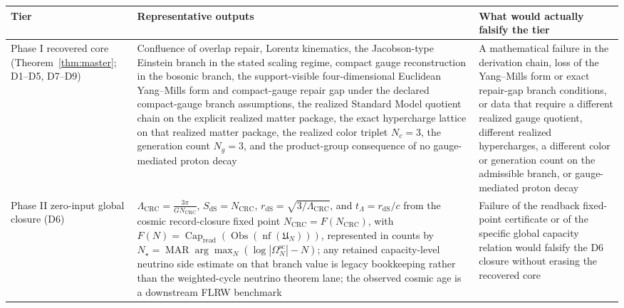\documentclass[11pt]{article}
\begin{document}
\begingroup
\footnotesize
\begin{longtable}{@{}>{\raggedright\arraybackslash}p{}>{\raggedright\arraybackslash}p{}>{\raggedright\arraybackslash}p{}@{}}
\toprule
Tier & Representative outputs & What would actually falsify the tier \\
\midrule
\endhead
\bottomrule
\endfoot
Phase I recovered core (Theorem~\ref{thm:master}; D1--D5, D7--D9) & Confluence of overlap repair, Lorentz kinematics, the Jacobson-type Einstein branch in the stated scaling regime, compact gauge reconstruction in the bosonic branch, the support-visible four-dimensional Euclidean Yang--Mills form and compact-gauge repair gap under the declared compact-gauge branch assumptions, the realized Standard Model quotient chain on the explicit realized matter package, the exact hypercharge lattice on that realized matter package, the realized color triplet \(N_c=3\), the generation count \(N_g=3\), and the product-group consequence of no gauge-mediated proton decay & A mathematical failure in the derivation chain, loss of the Yang--Mills form or exact repair-gap branch conditions, or data that require a different realized gauge quotient, different realized hypercharges, a different color or generation count on the admissible branch, or gauge-mediated proton decay \\
Phase II zero-input global closure (D6) & \(\Lambda_{\mathrm{CRC}}=\frac{3\pi}{G N_{\mathrm{CRC}}}\), \(S_{\mathrm{dS}}=N_{\mathrm{CRC}}\), \(r_{\mathrm{dS}}=\sqrt{3/\Lambda_{\mathrm{CRC}}}\), and \(t_\Lambda=r_{\mathrm{dS}}/c\) from the cosmic record-closure fixed point \(N_{\mathrm{CRC}}=F(N_{\mathrm{CRC}})\), with \(F(N)=\operatorname{Cap}_{\mathrm{read}}(\operatorname{Obs}(\operatorname{nf}(\mathfrak U_N)))\), represented in counts by \(N_\star=\operatorname{MAR}\arg\max_N(\log|\Omega^{\mathrm{sc}}_N|-N)\); any retained capacity-level neutrino side estimate on that branch value is legacy bookkeeping rather than the weighted-cycle neutrino theorem lane; the observed cosmic age is a downstream FLRW benchmark & Failure of the readback fixed-point certificate or of the specific global capacity relation would falsify the D6 closure without erasing the recovered core \\

\end{longtable}
\end{document}

